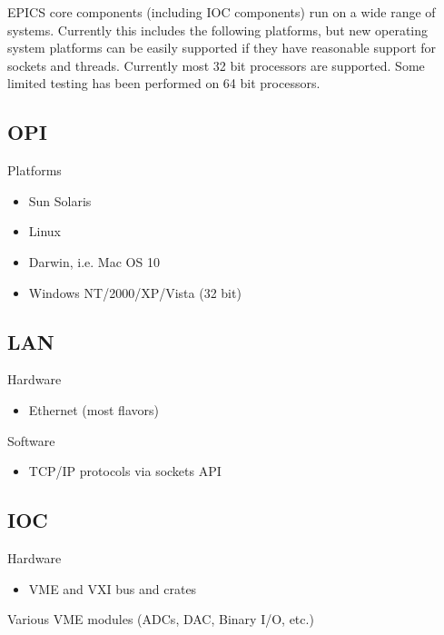 EPICS core components (including IOC components) run on a wide range of systems. Currently this includes the 
following platforms, but new operating system platforms can be easily supported if they have reasonable support for 
sockets and threads. Currently most 32 bit processors are supported. Some limited testing has been performed on 64 bit 
processors.

\subsection{OPI}

Platforms

\begin{itemize}\item Sun Solaris

\item Linux

\item Darwin, i.e. Mac OS 10

\item Windows NT/2000/XP/Vista (32 bit)

\end{itemize}\subsection{LAN}

Hardware

\begin{itemize}\item Ethernet (most flavors)

\end{itemize}Software

\begin{itemize}\item TCP/IP protocols via sockets API

\end{itemize}\subsection{IOC}

Hardware

\begin{itemize}\item VME and VXI bus and crates

\end{itemize}Various VME modules (ADCs, DAC, Binary I/O, etc.)

